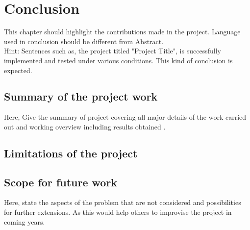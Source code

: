 \chapter{Conclusion}
This chapter should highlight the contributions made in the project. Language used in conclusion should be different from Abstract.\\
Hint: Sentences such as, the project titled "Project Title", is successfully implemented and tested under various conditions. This kind of conclusion is expected.\\

\section{Summary of the project work}
Here, Give the summary of project covering all major details of the work carried out and working overview including results obtained . \\

\section{Limitations of the project}
\section{Scope for future work}
Here, state the aspects of the problem that are not considered and possibilities for further extensions. As this would help others to improvise the project in coming years.